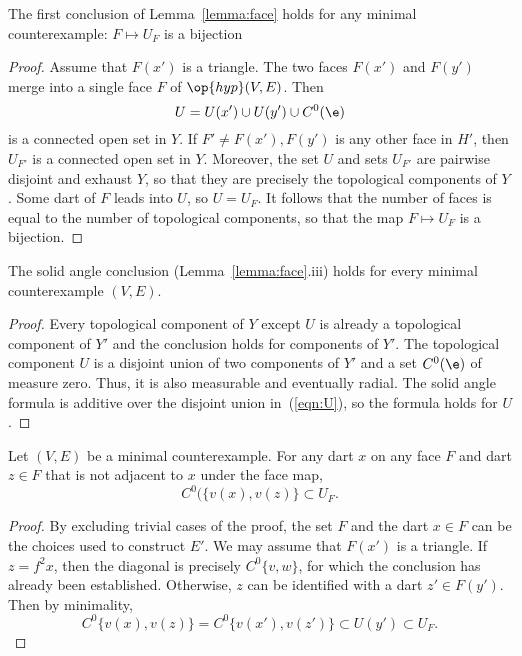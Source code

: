 \begin{lemma}
The first conclusion of Lemma~\ref{lemma:face} holds for any minimal counterexample:
$F\mapsto U_F$ is a bijection
\end{lemma}

\begin{proof}
Assume that $F(x')$ is a triangle.
The two faces $F(x')$ and $F(y')$ merge into a single face $F$ of $\op{hyp}(V,E)$.
Then 
\begin{equation}\label{eqn:U}
U= U(x')\cup U(y')\cup C^0(\e)
\end{equation} 
is a connected open set in $Y$.
If $F'\ne F(x'),F(y')$ is any other face in $H'$, then $U_{F'}$ is
a connected open set in $Y$.  Moreover, the set $U$ and sets $U_{F'}$
are pairwise disjoint and exhaust $Y$, so that they are precisely the topological
components of $Y$.  Some dart of $F$ leads into $U$, so $U=U_F$.  It follows
that the number of faces is equal to the number of topological components, so that the map $F\mapsto U_F$ is a bijection.
\end{proof}


\begin{lemma}  The solid angle conclusion (Lemma~\ref{lemma:face}.iii) holds for every minimal counterexample $(V,E)$.
\end{lemma}

\begin{proof} Every topological component of $Y$ 
except $U$ is already a topological component of $Y'$ and the conclusion
holds for components of $Y'$.  The topological component $U$ is a disjoint union of two
components of $Y'$ and a set $C^0(\e)$ of measure zero.  Thus, it
is also measurable and eventually radial.  The solid angle formula is
additive over the disjoint union in~(\ref{eqn:U}), so the formula holds for $U$.
\end{proof}
%


\begin{lemma}  Let $(V,E)$ be a minimal counterexample.  For any dart $x$ on any face $F$ and dart $z\in F$ that is not adjacent to $x$ under the face map, 
$$
C^0(\{v(x),v(z)\} \subset U_F.
$$
\end{lemma}

\begin{proof}  By excluding trivial cases of the proof,  the set $F$ and the dart $x\in F$ can be the choices used to construct $E'$.
We may assume that $F(x')$ is a triangle.
If $z=f^2x$, then the diagonal is precisely $C^0\{v,w\}$,
for which the conclusion has already been established.  Otherwise, $z$ can be identified with
a dart $z'\in F(y')$.  Then by minimality,
$$
C^0\{v(x),v(z)\} = C^0\{v(x'),v(z')\} \subset U(y') \subset U_F.
$$
\end{proof}

